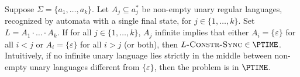  
\begin{propositionrep}
\label{prop:stricly_bounded_P}
 Suppose $\Sigma = \{a_1, \ldots, a_k\}$.
 Let $A_j \subseteq a_j^*$ be non-empty unary regular languages, recognized
 by automata with a single final state, for $j \in \{1,\ldots, k\}$.
 Set $L = A_1 \cdot\ldots\cdot A_k$.
 If for all $j \in \{1,\ldots, k\}$, $A_j$ infinite implies that either $A_i = \{\varepsilon\}$
 for all $i < j$ or $A_i = \{\varepsilon\}$ for all $i > j$ (or both), then $L\textsc{-Constr-Sync} \in \PTIME$. 
 Intuitively, if no infinite unary language lies strictly in the middle between 
 non-empty unary languages different from $\{\varepsilon\}$,
 then the problem is in $\PTIME$.
\end{propositionrep} 
